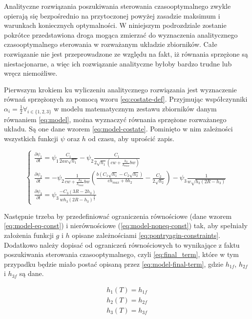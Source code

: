 Analityczne rozwiązania poszukiwania sterowania czasooptymalnego zwykle opierają się bezpośrednio na przytoczonej powyżej zasadzie maksimum i warunkach koniecznych optymalności. W niniejszym podrozdziale zostanie pokrótce przedstawiona droga mogąca zmierzać do wyznaczenia analitycznego czasooptymalnego sterowania w rozważanym układzie zbiorników. Całe rozwiązanie nie jest przeprowadzone ze względu na fakt, iż równania sprzężone są niestacjonarne, a więc ich rozwiązanie analityczne byłoby bardzo trudne lub wręcz niemożliwe.

Pierwszym krokiem ku wyliczeniu analitycznego rozwiązania jest wyznaczenie równań sprzężonych za pomocą wzoru \ref{eq:costate-def}. Przyjmując współczynniki $\alpha_{i} = \frac{1}{2} \forall_{i \in \{1, 2, 3\}}$ w modelu matematycznym zestawu zbiorników danym równaniem \ref{eq:model}, można wyznaczyć równania sprzężone rozważanego układu. Są one dane wzorem \ref{eq:model-costate}. Pominięto w nim zależności wszystkich funkcji $\psi$ oraz $h$ od czasu, aby uprościć zapis.

\begin{equation}\label{eq:model-costate}
	\left \{
	\begin{array}{lr}
		\frac{\partial \psi_{1}}{\partial t} =  \psi_{1}\frac{C_{1}}{2aw\sqrt{h_{1}}} - \psi_{2}\frac{C_{1}}{2\sqrt{h_{1}}(cw + \frac{h_{2}}{h_{max}}bw)} \\[20pt]
		\frac{\partial \psi_{2}}{\partial t} = - \psi_{2}\frac{1}{cw + \frac{h_{2}}{h_{max}}bw}(\frac{b(C_{1}\sqrt{h_{1}} - C_{2}\sqrt{h_{2}})}{ch_{max} + bh_{2}} - \frac{C_{2}}{2\sqrt{h_{2}}}) - \psi_{3}\frac{1}{w\sqrt{h_{3}(2R - h_{3})}} \\[20pt]
		\frac{\partial \psi_{3}}{\partial t} = \psi_{3}\frac{-C_{3}(3R - 2h_{3})}{wh_{3}(2R - h_{3})^{\frac{3}{2}}}
	\end{array}
	\right.
\end{equation}

Następnie trzeba by przedefiniować ograniczenia równościowe (dane wzorem \ref{eq:model-eq-const}) i nierównościowe (\ref{eq:model-noneq-const}) tak, aby spełniały założenia funkcji $g$ i $h$ opisane zależnościami \ref{eq:pontryagin-constraints}.
Dodatkowo należy dopisać od ograniczeń równościowych to wynikające z faktu poszukiwania sterowania czasooptymalnego, czyli \ref{eq:final_term}, które w tym przypadku będzie miało postać opisaną przez \ref{eq:model-final-term}, gdzie $h_{1f}$, $h_{2f}$ i $h_{3f}$ są dane.

\begin{equation}\label{eq:model-final-term}
\begin{array}{lr}
    h_{1}(T) = h_{1f}\\
    h_{2}(T) = h_{2f}\\
    h_{3}(T) = h_{3f}
\end{array}
\end{equation}

